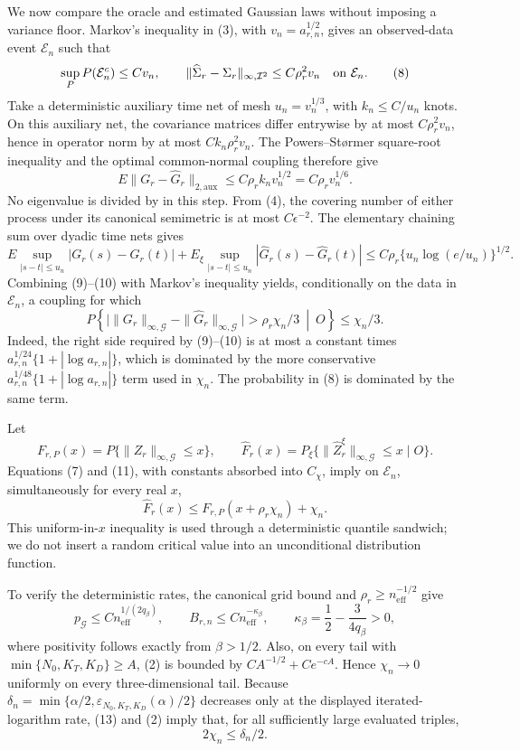 We now compare the oracle and estimated Gaussian laws without imposing a
variance floor.  Markov's inequality in (3), with
\(v_n=a_{r,n}^{1/2}\), gives an observed-data event \(\mathcal E_n\) such
that
\[
 \sup_P P(\mathcal E_n^c)\le Cv_n,
 \qquad
 \|\widehat\Sigma_r-\Sigma_r\|_{\infty,\mathcal I^2}
 \le C\rho_r^2v_n\quad\hbox{on }\mathcal E_n.              \tag{8}
\]
Take a deterministic auxiliary time net of mesh
\(u_n=v_n^{1/3}\), with \(k_n\le C/u_n\) knots.  On this auxiliary net,
the covariance matrices differ entrywise by at most \(C\rho_r^2v_n\),
hence in operator norm by at most \(Ck_n\rho_r^2v_n\).  The
Powers--St\o rmer square-root inequality and the optimal common-normal
coupling therefore give
\[
 E\|G_r-\widehat G_r\|_{2,\mathrm{aux}}
 \le C\rho_r k_nv_n^{1/2}=C\rho_r v_n^{1/6}.               \tag{9}
\]
No eigenvalue is divided by in this step.  From (4), the covering number of
either process under its canonical semimetric is at most \(C\epsilon^{-2}\).
The elementary chaining sum over dyadic time nets gives
\[
 E\sup_{|s-t|\le u_n}|G_r(s)-G_r(t)|
 +E_\xi\sup_{|s-t|\le u_n}|\widehat G_r(s)-\widehat G_r(t)|
 \le C\rho_r\{u_n\log(e/u_n)\}^{1/2}.                     \tag{10}
\]
Combining (9)--(10) with Markov's inequality yields, conditionally on the
data in \(\mathcal E_n\), a coupling for which
\[
 P\left\{
 \big|\|G_r\|_{\infty,\mathcal G}
       -\|\widehat G_r\|_{\infty,\mathcal G}\big|
 >\rho_r\chi_n/3\ \middle|\ O\right\}\le\chi_n/3.        \tag{11}
\]
Indeed, the right side required by (9)--(10) is at most a constant times
\(a_{r,n}^{1/24}\{1+|\log a_{r,n}|\}\), which is dominated by the more
conservative \(a_{r,n}^{1/48}\{1+|\log a_{r,n}|\}\) term used in
\(\chi_n\).  The probability in (8) is dominated by the same term.

Let
\[
 F_{r,P}(x)=P\{\|Z_r\|_{\infty,\mathcal G}\le x\},
 \qquad
 \widehat F_r(x)=P_\xi\{\|\widehat Z_r^\xi\|_{\infty,\mathcal G}\le x
 \mid O\}.
\]
Equations (7) and (11), with constants absorbed into \(C_\chi\), imply on
\(\mathcal E_n\), simultaneously for every real \(x\),
\[
 \widehat F_r(x)
 \le F_{r,P}(x+\rho_r\chi_n)+\chi_n.                       \tag{12}
\]
This uniform-in-\(x\) inequality is used through a deterministic quantile
sandwich; we do not insert a random critical value into an unconditional
distribution function.

To verify the deterministic rates, the canonical grid bound and
\(\rho_r\ge n_{\mathrm{eff}}^{-1/2}\) give
\[
 p_{\mathcal G}\le Cn_{\mathrm{eff}}^{1/(2q_\beta)},
 \qquad
 B_{r,n}\le Cn_{\mathrm{eff}}^{-\kappa_\beta},
 \qquad
 \kappa_\beta=\frac12-\frac{3}{4q_\beta}>0,               \tag{13}
\]
where positivity follows exactly from \(\beta>1/2\).  Also, on every tail
with \(\min\{N_0,K_T,K_D\}\ge A\), (2) is bounded by
\(CA^{-1/2}+Ce^{-cA}\).  Hence \(\chi_n\to0\) uniformly on every
three-dimensional tail.  Because
\(\delta_n=\min\{\alpha/2,\varepsilon_{N_0,K_T,K_D}(\alpha)/2\}\)
decreases only at the displayed iterated-logarithm rate, (13) and (2) imply
that, for all sufficiently large evaluated triples,
\[
 2\chi_n\le\delta_n/2.                                     \tag{14}
\]

